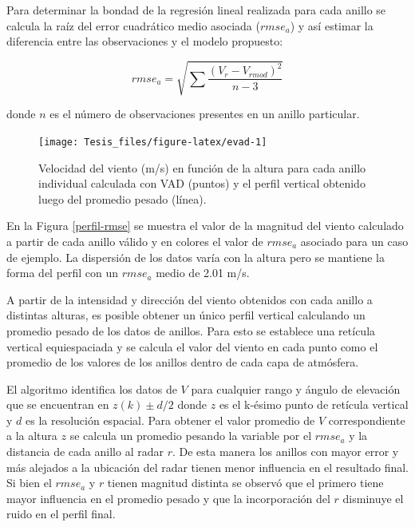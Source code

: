 \documentclass[12pt,spanish,oneside, a4paper]{book}
\begin{document}
Para determinar la bondad de la regresión lineal realizada para cada
anillo se calcula la raíz del error cuadrático medio asociada
(\(rmse_a\)) y así estimar la diferencia entre las observaciones y el
modelo propuesto:

\begin{equation}\label{eq-vr8}
rmse_a = \sqrt {\sum \frac {(V_r - V_{rmod} )^2} {n-3}}
\end{equation}

donde \(n\) es el número de observaciones presentes en un anillo
particular.

\begin{figure}

{\centering \texttt{[image: Tesis\_files/figure-latex/evad-1]} 

}

\caption{Velocidad del viento (m/s) en función de la altura para cada anillo individual calculada con VAD (puntos) y el perfil vertical obtenido luego del promedio pesado (línea). \label{perfil-rmse}}\label{fig:evad}
\end{figure}

En la Figura \ref{perfil-rmse} se muestra el valor de la magnitud del
viento calculado a partir de cada anillo válido y en colores el valor de
\(rmse_a\) asociado para un caso de ejemplo. La dispersión de los datos
varía con la altura pero se mantiene la forma del perfil con un
\(rmse_a\) medio de 2.01 m/s.

A partir de la intensidad y dirección del viento obtenidos con cada
anillo a distintas alturas, es posible obtener un único perfil vertical
calculando un promedio pesado de los datos de anillos. Para esto se
establece una retícula vertical equiespaciada y se calcula el valor del
viento en cada punto como el promedio de los valores de los anillos
dentro de cada capa de atmósfera.

El algoritmo identifica los datos de \(V\) para cualquier rango y ángulo
de elevación que se encuentran en \(z(k) \pm d/2\) donde \(z\) es el
k-ésimo punto de retícula vertical y \(d\) es la resolución espacial.
Para obtener el valor promedio de \(V\) correspondiente a la altura
\(z\) se calcula un promedio pesando la variable por el \(rmse_a\) y la
distancia de cada anillo al radar \(r\). De esta manera los anillos con
mayor error y más alejados a la ubicación del radar tienen menor
influencia en el resultado final. Si bien el \(rmse_a\) y \(r\) tienen
magnitud distinta se observó que el primero tiene mayor influencia en el
promedio pesado y que la incorporación del \(r\) disminuye el ruido en
el perfil final.
\end{document}
